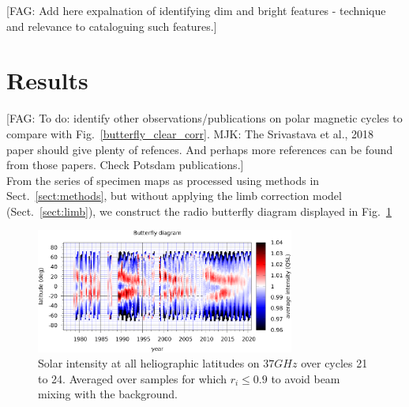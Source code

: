 \documentclass{aa}
\newcommand{\fag}[1]{\textcolor{midpurple}{[FAG: #1]}} %
\begin{document}






\fag{Add here expalnation of identifying dim and bright features - technique and relevance to cataloguing such features.}

\section{Results}\label{sect:results}
\fag{To do: identify other observations/publications on polar magnetic cycles to compare with
Fig.~\ref{butterfly_clear_corr}. MJK: The Srivastava et al., 2018 paper should give plenty of refences. And perhaps more references can be found from those papers. Check Potsdam publications.}\\

From the series of specimen maps as processed using methods in 
Sect.~\ref{sect:methods}, but without applying the limb correction model
(Sect.~\ref{sect:limb}), we construct the radio butterfly diagram  
displayed in Fig.~\ref{butterfly_clear_raw}

\begin{figure}
\centering
\includegraphics[width=8.5cm]{butterfly_clear_raw.png}
\caption{Solar intensity at all heliographic latitudes on $\si{37}{GHz}$ over cycles 21 to 24. Averaged over samples for which $r_i \le 0.9$ to avoid beam mixing with the background.
}
\label{butterfly_clear_raw}
\end{figure}
\end{document}
